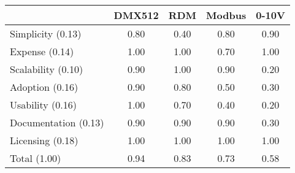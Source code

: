     \begin{tabular}{|l|c|c|c|c|}
        \hline
        ~                    & DMX512 & RDM  & Modbus & 0-10V \\ \hline
        Simplicity    (0.13) & 0.80   & 0.40 & 0.80   & 0.90  \\ \hline
        Expense       (0.14) & 1.00   & 1.00 & 0.70   & 1.00  \\ \hline
        Scalability   (0.10) & 0.90   & 1.00 & 0.90   & 0.20  \\ \hline
        Adoption      (0.16) & 0.90   & 0.80 & 0.50   & 0.30  \\ \hline
        Usability     (0.16) & 1.00   & 0.70 & 0.40   & 0.20  \\ \hline
        Documentation (0.13) & 0.90   & 0.90 & 0.90   & 0.30  \\ \hline
        Licensing     (0.18) & 1.00   & 1.00 & 1.00   & 1.00  \\ \hline
        Total         (1.00) & 0.94   & 0.83 & 0.73   & 0.58  \\ \hline
    \end{tabular}
